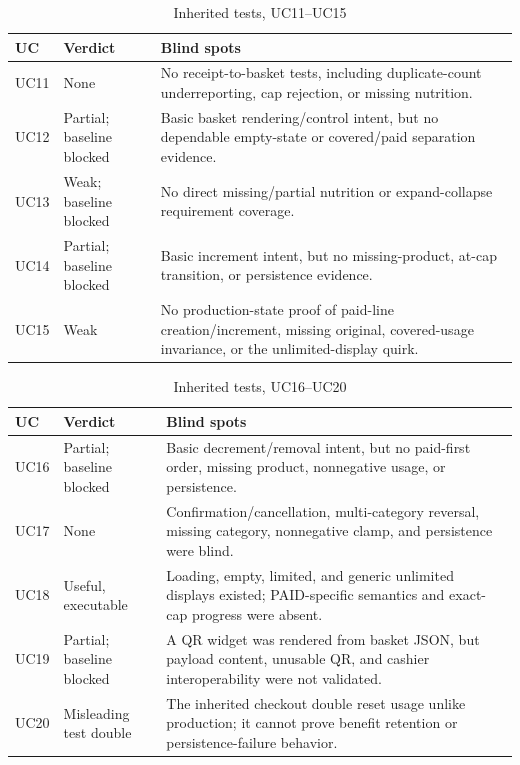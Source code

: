 \documentclass[sigconf]{acmart}
\begin{document}
\begin{table}[H]
  \caption{Inherited tests, UC11--UC15}
  \label{tab:inherited-3}
  \centering
  \scriptsize
  \begin{tabular}{@{}L{0.09\columnwidth}L{0.28\columnwidth}L{0.53\columnwidth}@{}}
    \toprule
    UC & Verdict & Blind spots \\
    \midrule
    UC11 & None & No receipt-to-basket tests, including duplicate-count underreporting, cap rejection, or missing nutrition. \\
    UC12 & Partial; baseline blocked & Basic basket rendering/control intent, but no dependable empty-state or covered/paid separation evidence. \\
    UC13 & Weak; baseline blocked & No direct missing/partial nutrition or expand-collapse requirement coverage. \\
    UC14 & Partial; baseline blocked & Basic increment intent, but no missing-product, at-cap transition, or persistence evidence. \\
    UC15 & Weak & No production-state proof of paid-line creation/increment, missing original, covered-usage invariance, or the unlimited-display quirk. \\
    \bottomrule
  \end{tabular}
\end{table}

\begin{table}[H]
  \caption{Inherited tests, UC16--UC20}
  \label{tab:inherited-4}
  \centering
  \scriptsize
  \begin{tabular}{@{}L{0.09\columnwidth}L{0.28\columnwidth}L{0.53\columnwidth}@{}}
    \toprule
    UC & Verdict & Blind spots \\
    \midrule
    UC16 & Partial; baseline blocked & Basic decrement/removal intent, but no paid-first order, missing product, nonnegative usage, or persistence. \\
    UC17 & None & Confirmation/cancellation, multi-category reversal, missing category, nonnegative clamp, and persistence were blind. \\
    UC18 & Useful, executable & Loading, empty, limited, and generic unlimited displays existed; PAID-specific semantics and exact-cap progress were absent. \\
    UC19 & Partial; baseline blocked & A QR widget was rendered from basket JSON, but payload content, unusable QR, and cashier interoperability were not validated. \\
    UC20 & Misleading test double & The inherited checkout double reset usage unlike production; it cannot prove benefit retention or persistence-failure behavior. \\
    \bottomrule
  \end{tabular}
\end{table}
\end{document}
